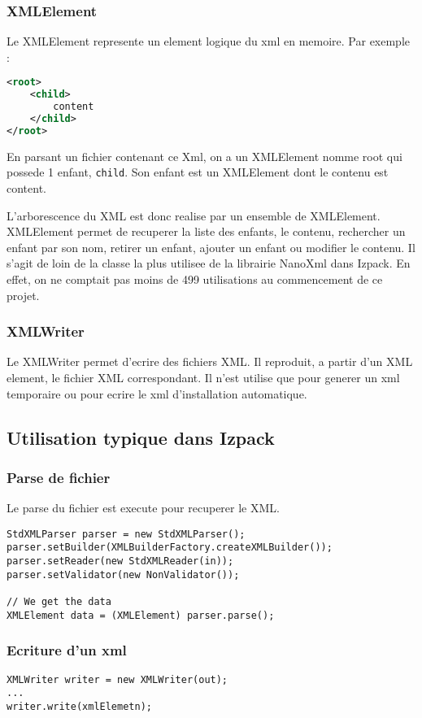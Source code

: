 \subsubsection{XMLElement}
Le XMLElement represente un element logique du xml en memoire. Par exemple :
\begin{lstlisting}[language=xml]
<root>
	<child>
		content
	</child>
</root>
\end{lstlisting}
En parsant un fichier contenant ce Xml, on a un XMLElement nomme root qui possede 1 enfant, \verb|child|. Son enfant est un XMLElement dont le contenu est content.

L'arborescence du XML est donc realise par un ensemble de XMLElement. XMLElement permet de recuperer la liste des enfants, le contenu, rechercher un enfant par son nom, retirer un enfant, ajouter un enfant ou modifier le contenu. Il s'agit de loin de la classe la plus utilisee de la librairie NanoXml dans Izpack. En effet, on ne comptait pas moins de 499 utilisations au commencement de ce projet.
\subsubsection{XMLWriter}
Le XMLWriter permet d'ecrire des fichiers XML. Il reproduit, a partir d'un XML element, le fichier XML correspondant. Il n'est utilise que pour generer un xml temporaire ou pour ecrire le xml d'installation automatique. 
\subsection{Utilisation typique dans Izpack}
\subsubsection{Parse de fichier}
Le parse du fichier est execute pour recuperer le XML.
\begin{lstlisting}
StdXMLParser parser = new StdXMLParser();
parser.setBuilder(XMLBuilderFactory.createXMLBuilder());
parser.setReader(new StdXMLReader(in));
parser.setValidator(new NonValidator());

// We get the data
XMLElement data = (XMLElement) parser.parse();
\end{lstlisting}
\subsubsection{Ecriture d'un xml}
\begin{lstlisting}
XMLWriter writer = new XMLWriter(out);
...
writer.write(xmlElemetn);
\end{lstlisting}
